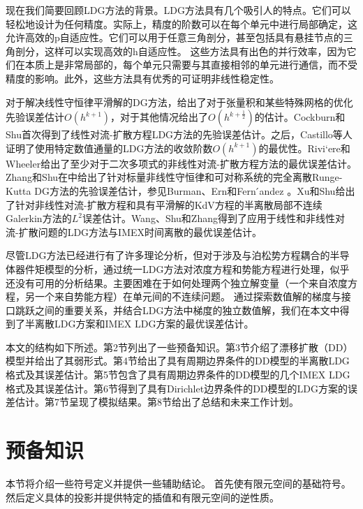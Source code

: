 现在我们简要回顾LDG方法的背景。LDG方法具有几个吸引人的特点\parencite{xu2010local}。它们可以轻松地设计为任何精度。实际上，精度的阶数可以在每个单元中进行局部确定，这允许高效的p自适应性。它们可以用于任意三角剖分，甚至包括具有悬挂节点的三角剖分，这样可以实现高效的h自适应性。
这些方法具有出色的并行效率，因为它们在本质上是非常局部的，每个单元只需要与其直接相邻的单元进行通信，而不受精度的影响。此外，这些方法具有优秀的可证明非线性稳定性。

对于解决线性守恒律平滑解的DG方法，\parencite{richter1988optimalordera,meng2015optimal,lesaint1974finite,johnson1986analysisa,cockburn2008optimala}给出了对于张量积和某些特殊网格的优化先验误差估计$O(h^{k+1})$，对于其他情况给出了$O(h^{k+\frac{1}{2}})$的估计。Cockburn和Shu\parencite{cockburn1998local}首次得到了线性对流-扩散方程LDG方法的先验误差估计。之后，Castillo等人\parencite{castillo2000optimala,castillo2000priorib,castillo2002optimalb}证明了使用特定数值通量的LDG方法的收敛阶数$O(h^{k+1})$的最优性。Rivi`ere和Wheeler\parencite{cockburn2000development}给出了至少对于二次多项式的非线性对流-扩散方程方法的最优误差估计。Zhang和Shu在\parencite{zhang2004errorc,zhang2006errorb,zhang2010stabilitya,luo2015priori}中给出了针对标量非线性守恒律和可对称系统的完全离散Runge-Kutta DG方法的先验误差估计，参见Burman、Ern和Fern ́andez \parencite{burman2010explicit}。Xu和Shu\parencite{xu2007errora}给出了针对非线性对流-扩散方程和具有平滑解的KdV方程的半离散局部不连续Galerkin方法的$L^2$误差估计。Wang、Shu和Zhang\parencite{wang2015stability,wang2015stabilityd}得到了应用于线性和非线性对流-扩散问题的LDG方法与IMEX时间离散的最优误差估计。

尽管LDG方法已经进行有了许多理论分析，但对于涉及与泊松势方程耦合的半导体器件矩模型的分析，通过统一LDG方法对浓度方程和势能方程进行处理，似乎还没有可用的分析结果。主要困难在于如何处理两个独立解变量（一个来自浓度方程，另一个来自势能方程）在单元间的不连续问题。
通过探索数值解的梯度与接口跳跃之间的重要关系，并结合LDG方法中梯度的独立数值解，我们在本文中得到了半离散LDG方案和IMEX LDG方案的最优误差估计。

本文的结构如下所述。第2节列出了一些预备知识。第3节介绍了漂移扩散（DD）模型并给出了其弱形式。第4节给出了具有周期边界条件的DD模型的半离散LDG格式及其误差估计。第5节包含了具有周期边界条件的DD模型的几个IMEX LDG格式及其误差估计。第6节得到了具有Dirichlet边界条件的DD模型的LDG方案的误差估计。第7节呈现了模拟结果。第8节给出了总结和未来工作计划。
\section{预备知识}
本节将介绍一些符号定义并提供一些辅助结论。
首先使有限元空间的基础符号。然后定义具体的投影并提供特定的插值和有限元空间的逆性质。
